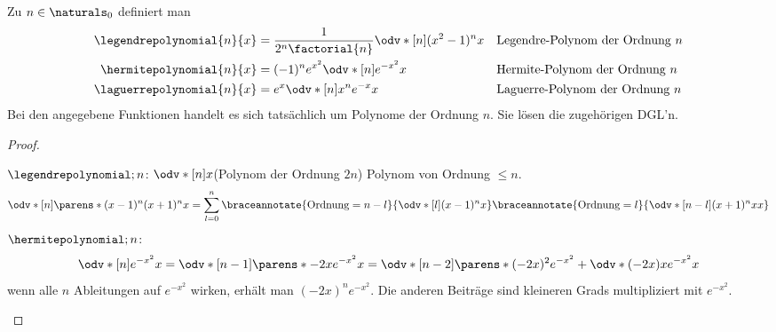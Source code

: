 \begin{lemma}
  Zu \( n\in \naturals_0 \) definiert man
  \begin{align*}
    \legendrepolynomial{n}{x}&=\frac{1}{2^n \factorial{n}}\odv*[n]{(x^2-1)^n}{x}&&\text{Legendre-Polynom der Ordnung \( n \)}\\
    \hermitepolynomial{n}{x}&=(-1)^n e^{x^2}\odv*[n]{e^{-x^2}}{x}&&\text{Hermite-Polynom der Ordnung \( n \)}\\
    \laguerrepolynomial{n}{x}&=e^x\odv*[n]{x^n e^{-x}}{x}&&\text{Laguerre-Polynom der Ordnung \( n \)}
  \end{align*}
  Bei den angegebene Funktionen handelt es sich tatsächlich um Polynome der Ordnung \( n \). Sie lösen die zugehörigen DGL'n.
\end{lemma}
\begin{proof}
  \begin{proofdescription}
    \item[\ordinalnum{1} \Beh] \( \legendrepolynomial;{n} \): \( \odv*[n]{}{x} \)(Polynom der Ordnung \( 2n \)) \teq Polynom von Ordnung \( \leq n \).
    \begin{equation*}
      \odv*[n]{\parens*{(x-1)^n(x+1)^n}}{x}=\sum_{l=0}^{n}\braceannotate{\text{Ordnung}=n-l}{\odv*[l]{(x-1)^n}{x}}\braceannotate{\text{Ordnung}=l}{\odv*[n-l]{(x+1)^n{x}}{x}}
    \end{equation*}
    \( \hermitepolynomial;{n} \):
    \begin{equation*}
      \odv*[n]{e^{-x^2}}{x}=\odv*[n-1]{\parens*{-2xe^{-x^2}}}{x}=\odv*[n-2]{\parens*{(-2x)^2e^{-x^2}+\odv*{(-2x)}{x}e^{-x^2}}}{x}
    \end{equation*}
    \timplies wenn alle \( n \) Ableitungen auf \( e^{-x^2} \) wirken, erhält man \( (-2x)^n e^{-x^2} \). Die anderen Beiträge sind kleineren Grads multipliziert mit \( e^{-x^2} \).


\end{proofdescription}
\end{proof}

